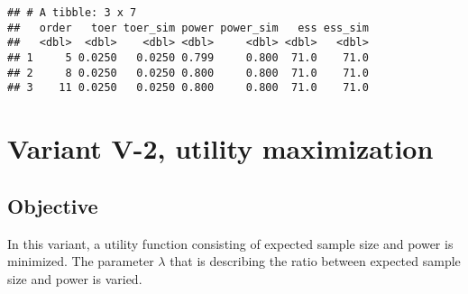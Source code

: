 \documentclass[
]{book}
\newenvironment{Shaded}{\begin{snugshade}}{\end{snugshade}}
\newcommand{\DecValTok}[1]{\textcolor[rgb]{0.00,0.00,0.81}{#1}}
\newcommand{\KeywordTok}[1]{\textcolor[rgb]{0.13,0.29,0.53}{\textbf{#1}}}
\newcommand{\NormalTok}[1]{#1}
\newcommand{\OperatorTok}[1]{\textcolor[rgb]{0.81,0.36,0.00}{\textbf{#1}}}
\newcommand{\StringTok}[1]{\textcolor[rgb]{0.31,0.60,0.02}{#1}}
\begin{document}
\begin{Shaded}
\end{Shaded}

\begin{verbatim}
## # A tibble: 3 x 7
##   order   toer toer_sim power power_sim   ess ess_sim
##   <dbl>  <dbl>    <dbl> <dbl>     <dbl> <dbl>   <dbl>
## 1     5 0.0250   0.0250 0.799     0.800  71.0    71.0
## 2     8 0.0250   0.0250 0.800     0.800  71.0    71.0
## 3    11 0.0250   0.0250 0.800     0.800  71.0    71.0
\end{verbatim}

\hypertarget{variantV_2}{%
\section{Variant V-2, utility maximization}\label{variantV_2}}

\hypertarget{objective-11}{%
\subsection{Objective}\label{objective-11}}

In this variant, a utility function consisting of expected sample size and
power is minimized.
The parameter \(\lambda\) that is describing the ratio between expected
sample size and power is varied.
\end{document}
